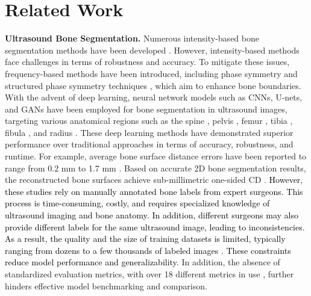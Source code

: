 \section{Related Work}
\label{Related Work}
\textbf{Ultrasound Bone Segmentation.} Numerous intensity-based bone segmentation methods have been developed \cite{review1,review2}. However, intensity-based methods face challenges in terms of robustness and accuracy. To mitigate these issues, frequency-based methods have been introduced, including phase symmetry and structured phase symmetry techniques \cite{phase_symmetry3,bone_shadow_and_phase}, which aim to enhance bone boundaries. With the advent of deep learning, neural network models such as CNNs, U-nets, and GANs have been employed for bone segmentation in ultrasound images, targeting various anatomical regions such as the spine \cite{spine1,spine2,spine3}, pelvis \cite{pelvis, pelvis_femur_tibia}, femur \cite{femur_fibula_tibia_humerus_radius_ulna,pelvis_femur_tibia,radius_femur_tibia}, tibia \cite{pelvis_femur_tibia,radius_femur_tibia,femur_fibula_tibia_humerus_radius_ulna}, fibula \cite{femur_fibula_tibia_humerus_radius_ulna}, and radius \cite{radius_femur_tibia,femur_fibula_tibia_humerus_radius_ulna}. These deep learning methods have demonstrated superior performance over traditional approaches in terms of accuracy, robustness, and runtime. For example, average bone surface distance errors have been reported to range from 0.2 mm to 1.7 mm \cite{radius_femur_tibia, SSM, spine3,pelvis}. Based on accurate 2D bone segmentation results, the reconstructed bone surfaces achieve sub-millimetric one-sided CD \cite{pcd2}. \textcolor{black}{However, these studies rely on manually annotated bone labels from expert surgeons. This process is time-consuming, costly, and requires specialized knowledge of ultrasound imaging and bone anatomy. In addition, different surgeons may also provide different labels for the same ultrasound image, leading to inconsistencies. As a result, the quality and the size of training datasets is limited, typically ranging from dozens to a few thousands of labeled images \cite{review2}. These constraints reduce model performance and generalizability.} In addition, the absence of standardized evaluation metrics, with over 18 different metrics in use \cite{review1}, further hinders effective model benchmarking and comparison. 

